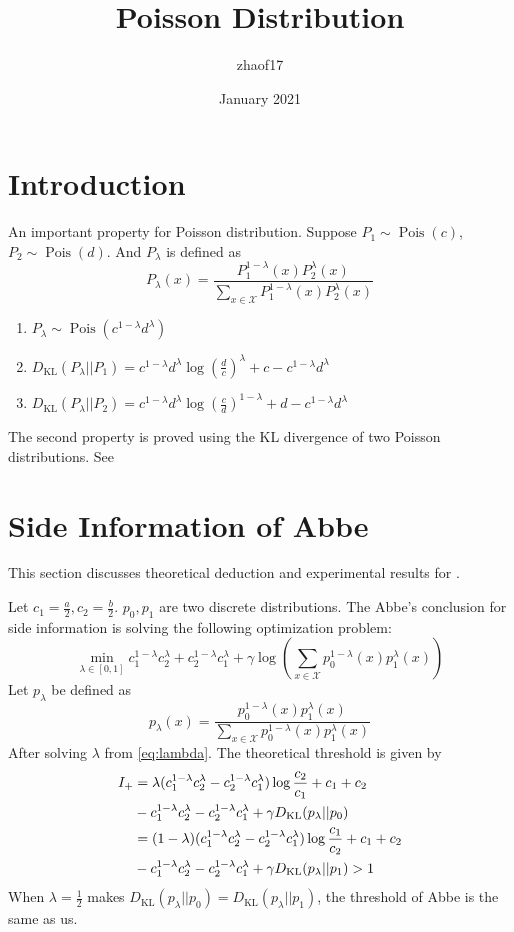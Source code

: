 \documentclass{article}
\title{Poisson Distribution}
\author{zhaof17 }
\date{January 2021}
\DeclareMathOperator{\Pois}{Pois}
\begin{document}
\maketitle

\section{Introduction}
An important property for Poisson distribution.
Suppose $P_1 \sim \Pois(c)$, $P_2 \sim \Pois(d)$.
And $P_{\lambda}$ is defined as 
$$
P_{\lambda}(x) = \frac{P_1^{1-\lambda}(x) P_2^{\lambda} (x)}
{\sum_{x \in \mathcal{X}}P_1^{1-\lambda}(x) P_2^{\lambda} (x)}
$$
\begin{enumerate}
    \item $P_{\lambda} \sim \Pois(c^{1-\lambda} d^{\lambda})$
    \item $D_{\mathrm{KL}}(P_{\lambda}||P_1) = c^{1-\lambda}d^{\lambda}\log(\frac{d}{c})^{\lambda} + c-c^{1-\lambda}d^{\lambda}$
    \item $D_{\mathrm{KL}}(P_{\lambda}||P_2) = c^{1-\lambda}d^{\lambda}\log(\frac{c}{d})^{1-\lambda} + d-c^{1-\lambda}d^{\lambda}$
\end{enumerate}
The second property is proved using the KL divergence
of two Poisson distributions. See \cite{kl}
\section{Side Information of Abbe}
This section discusses theoretical deduction and experimental results for \cite{abbe}.

Let $c_1 = \frac{a}{2}, c_2=\frac{b}{2}$. $p_0, p_1$ are two
discrete distributions.
The Abbe's conclusion for side information is solving the following
optimization problem:
\begin{equation}\label{eq:lambda}
    \min_{\lambda \in [0,1]} c_1^{1-\lambda}c_2^{\lambda} +
    c_2^{1-\lambda}c_1^{\lambda} + \gamma \log(\sum_{x\in \mathcal{X}}p^{1-\lambda}_0(x) p^{\lambda}_1(x))
\end{equation}
Let $p_{\lambda}$ be defined as
$$
p_{\lambda}(x) = \frac{p_0^{1-\lambda}(x) p_1^{\lambda} (x)}
{\sum_{x \in \mathcal{X}}p_0^{1-\lambda}(x) p_1^{\lambda} (x)}
$$
After solving $\lambda$ from \eqref{eq:lambda}. The theoretical
threshold is given by
\begin{align}
    I_+ &=\lambda (c_1^{1-\lambda}c_2^{\lambda} -
    c_2^{1-\lambda}c_1^{\lambda})\log\frac{c_2}{c_1}+c_1+c_2\notag \\
    &-c_1^{1-\lambda}c_2^{\lambda} -
    c_2^{1-\lambda}c_1^{\lambda}+\gamma D_{\mathrm{KL}}(p_{\lambda}||p_0) \\
    &=(1-\lambda) (c_1^{1-\lambda}c_2^{\lambda} -
    c_2^{1-\lambda}c_1^{\lambda})\log\frac{c_1}{c_2}+c_1+c_2\notag \\
    &-c_1^{1-\lambda}c_2^{\lambda} -
    c_2^{1-\lambda}c_1^{\lambda}+\gamma D_{\mathrm{KL}}(p_{\lambda}||p_1)
    >1
\end{align}
When $\lambda=\frac{1}{2}$ makes $D_{\mathrm{KL}}(p_{\lambda}||p_0)=
D_{\mathrm{KL}}(p_{\lambda}||p_1)$, the threshold of Abbe is the same as
us.
\end{document}
